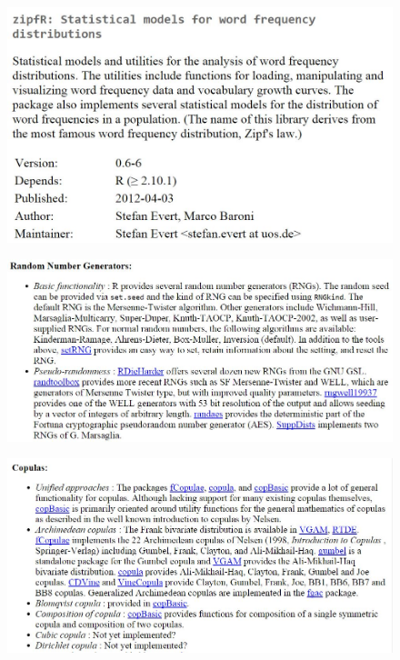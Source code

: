 \documentclass[MAIN.tex]{subfiles}
\begin{document}
\begin{frame}
	\begin{figure}
\centering
\includegraphics[width=1.05\linewidth]{images/zipfR}

\end{figure}

\end{frame}
\begin{frame}
	
\begin{figure}
\centering
\includegraphics[width=1.05\linewidth]{images/CRANrng}
\end{figure}

\end{frame}
\begin{frame}
	\begin{figure}
\centering
\includegraphics[width=1.05\linewidth]{images/CRANcopulas}

\end{figure}

\end{frame}
\end{document}
